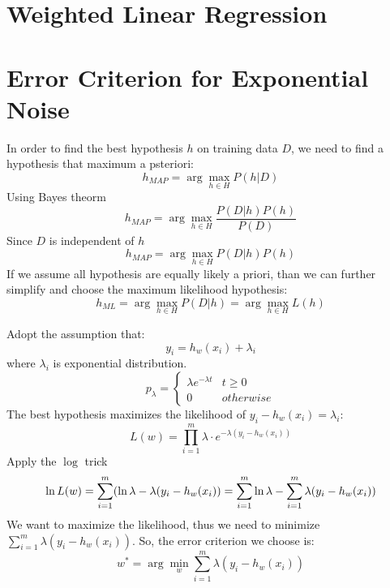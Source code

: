\documentclass[a4paper, 12pt, titlepage]{article}
\begin{document}
\begin{enumerate}[(a)]
            


\section{Weighted Linear Regression}
\section{Error Criterion for Exponential Noise}

In order to find the best hypothesis $h$ on training data $D$, we need to find a hypothesis that maximum a psteriori:
$$h_{MAP}=\arg\max_{h\in{}H}P(h|D)$$
Using Bayes theorm
$$h_{MAP}=\arg\max_{h\in{}H}\frac{P(D|h)P(h)}{P(D)}$$
Since $D$ is independent of $h$
$$h_{MAP}=\arg\max_{h\in{}H}P(D|h)P(h)$$
If we assume all hypothesis are equally likely a priori, than we can further simplify and choose the maximum likelihood hypothesis:
$$h_{ML}=\arg\max_{h\in{}H}P(D|h)=\arg\max_{h\in{}H}L(h)$$

Adopt the assumption that:
$$y_i=h_w(x_i)+\lambda_i$$
where $\lambda_i$ is exponential distribution.
$$
    p_\lambda=\begin{cases}
        \lambda{}e^{-\lambda{}t}&t\geq0 \\
        0&otherwise
    \end{cases}
$$
The best hypothesis maximizes the likelihood of $y_i-h_w(x_i)=\lambda_i$:
$$L(w)=\prod_{i=1}^m\lambda\cdot{}e^{-\lambda(y_i-h_w(x_i))}$$
Apply the $\log$ trick
$$\ln{}L(w)=\sum^m_{i=1}(\ln\lambda-\lambda(y_i-h_w(x_i))\\
=\sum^m_{i=1}\ln\lambda-\sum^m_{i=1}\lambda(y_i-h_w(x_i))$$
We want to maximize the likelihood, thus we need to minimize $\sum^m_{i=1}\lambda(y_i-h_w(x_i))$. So, the error criterion we choose is:
$$w^*=\arg\min_w\sum^m_{i=1}\lambda(y_i-h_w(x_i))$$


\end{enumerate}
\end{document}
